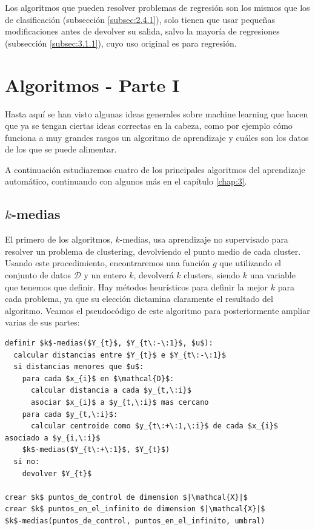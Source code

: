 Los algoritmos que pueden resolver problemas de regresión son los mismos que los de clasificación (subsección \ref{subsec:2.4.1}), solo tienen que usar pequeñas modificaciones antes de devolver su salida, salvo la mayoría de regresiones (subsección \ref{subsec:3.1.1}), cuyo uso original es para regresión.

\section{Algoritmos - Parte I} \label{sec:2.5}

Hasta aquí se han visto algunas ideas generales sobre machine learning que hacen que ya se tengan ciertas ideas correctas en la cabeza, como por ejemplo cómo funciona a muy grandes rasgos un algoritmo de aprendizaje y cuáles son los datos de los que se puede alimentar.

A continuación estudiaremos cuatro de los principales algoritmos del aprendizaje automático, continuando con algunos más en el capítulo \ref{chap:3}.

\subsection{$k$-medias} \label{subsec:2.5.1}

El primero de los algoritmos, $k$-medias, usa aprendizaje no supervisado para resolver un problema de clustering, devolviendo el punto medio de cada cluster. Usando este procedimiento, encontraremos una función $g$ que utilizando el conjunto de datos $\mathcal{D}$ y un entero $k$, devolverá $k$ clusters, siendo $k$ una variable que tenemos que definir. Hay métodos heurísticos para definir la mejor $k$ para cada problema, ya que su elección dictamina claramente el resultado del algoritmo. Veamos el pseudocódigo de este algoritmo para posteriormente ampliar varias de sus partes:

\vspace*{3mm}
\lstset{style=pseudocode}
\begin{lstlisting}
definir $k$-medias($Y_{t}$, $Y_{t\:-\:1}$, $u$):
  calcular distancias entre $Y_{t}$ e $Y_{t\:-\:1}$
  si distancias menores que $u$:
    para cada $x_{i}$ en $\mathcal{D}$:
      calcular distancia a cada $y_{t,\:i}$
      asociar $x_{i}$ a $y_{t,\:i}$ mas cercano
    para cada $y_{t,\:i}$:
      calcular centroide como $y_{t\:+\:1,\:i}$ de cada $x_{i}$ asociado a $y_{i,\:i}$
    $k$-medias($Y_{t\:+\:1}$, $Y_{t}$)
  si no:
    devolver $Y_{t}$

crear $k$ puntos_de_control de dimension $|\mathcal{X}|$
crear $k$ puntos_en_el_infinito de dimension $|\mathcal{X}|$
$k$-medias(puntos_de_control, puntos_en_el_infinito, umbral)
\end{lstlisting}


